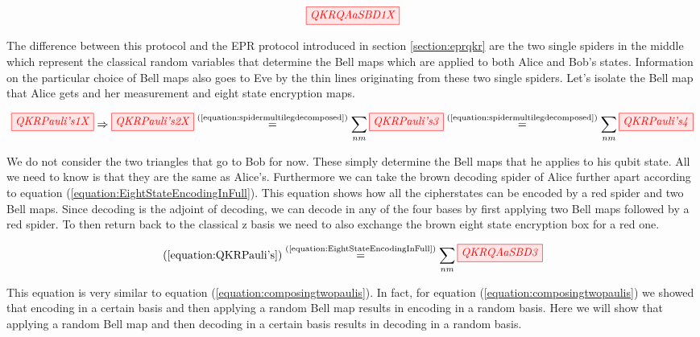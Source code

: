\documentclass[]{article}
\newcommand{\equaltext}[1]{\ensuremath{\stackrel{\text{#1}}{=}}}
\begin{document}
\begin{equation}
\label{equation:QKRQAaSBD1}
\tikzfig{QKRQAaSBD1X}
\end{equation}

The difference between this protocol and the EPR protocol introduced in section \ref{section:eprqkr} are the two single spiders in the middle which represent the classical random variables that determine the Bell maps which are applied to both Alice and Bob's states. Information on the particular choice of Bell maps also goes to Eve by the thin lines originating from these two single spiders. Let's isolate the Bell map that Alice gets and her measurement and eight state encryption maps.

\begin{equation}
	\label{equation:QKRPauli's}
	\tikzfig{QKRPauli's1X} \Rightarrow \tikzfig{QKRPauli's2X} \equaltext{(\ref{equation:spidermultilegdecomposed})} \sum\limits_{nm} \tikzfig{QKRPauli's3}  \equaltext{(\ref{equation:spidermultilegdecomposed})} \sum\limits_{nm} \tikzfig{QKRPauli's4}
\end{equation}

We do not consider the two triangles that go to Bob for now. These simply determine the Bell maps that he applies to his qubit state. All we need to know is that they are the same as Alice's. Furthermore we can take the brown decoding spider of Alice further apart according to equation (\ref{equation:EightStateEncodingInFull}). This equation shows how all the cipherstates can be encoded by a red spider and two Bell maps. Since decoding is the adjoint of decoding, we can decode in any of the four bases by first applying two Bell maps followed by a red spider. To then return back to the classical z basis we need to also exchange the brown eight state encryption box for a red one.

\begin{equation}
	\label{equation:QKRQAaSBD3}
	(\ref{equation:QKRPauli's}) \equaltext{(\ref{equation:EightStateEncodingInFull})} \sum\limits_{nm}\tikzfig{QKRQAaSBD3}
\end{equation}

This equation is very similar to equation (\ref{equation:composingtwopaulis}). In fact, for equation (\ref{equation:composingtwopaulis}) we showed that encoding in a certain basis and then applying a random Bell map results in encoding in a random basis. Here we will show that applying a random Bell map and then decoding in a certain basis results in decoding in a random basis.
\end{document}
